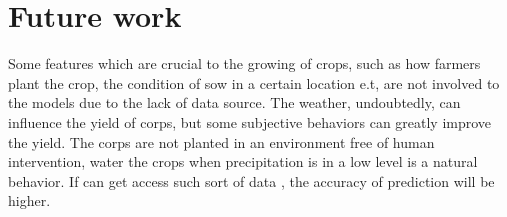 \documentclass[conference]{IEEEtran}
\begin{document}
\section{Future work} \label{sec:fw}
Some features which are crucial to the growing of crops, such as how farmers plant the crop, the condition of sow in a certain location e.t, are not involved to the models due to the lack of data source. The weather, undoubtedly, can influence the yield of corps, but some subjective behaviors can greatly improve the yield. The corps are not planted in an environment free of human intervention, water the crops when precipitation is in a low level is a natural behavior. If can get access such sort of data , the accuracy of prediction will be higher. 



\end{document}
